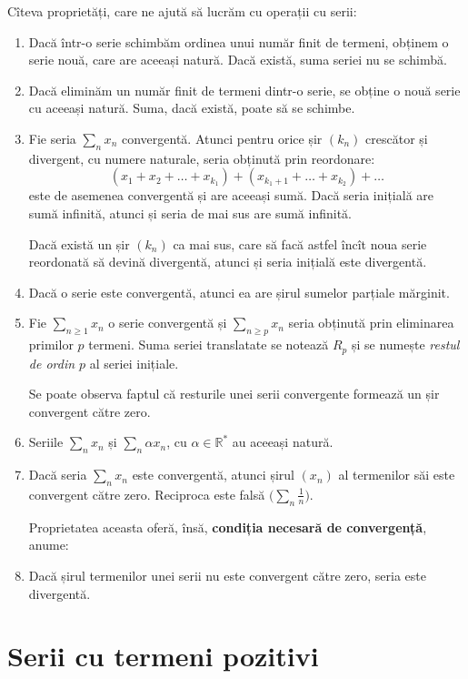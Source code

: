 \documentclass[11pt,a4paper]{article}
\newcommand\RR{\mathbb{R}}
\theoremstyle{dotless}
\theoremstyle{dotlessdr}
\begin{document}
Cîteva proprietăți, care ne ajută să lucrăm cu operații cu serii:
\begin{enumerate}[(1)]
  \item Dacă într-o serie schimbăm ordinea unui număr finit de termeni, obținem
    o serie nouă, care are aceeași natură. Dacă există, suma seriei nu se schimbă.
  \item Dacă eliminăm un număr finit de termeni dintr-o serie, se obține o nouă serie
    cu aceeași natură. Suma, dacă există, poate să se schimbe.
  \item Fie seria $\sum_n x_n$ convergentă. Atunci pentru orice șir $(k_n)$ crescător
    și divergent, cu numere naturale, seria obținută prin reordonare:
    \[
      (x_1 + x_2 + \dots + x_{k_1}) + (x_{k_1 + 1} + \dots + x_{k_2}) + \dots
    \]
    este de asemenea convergentă și are aceeași sumă. Dacă seria inițială are sumă
    infinită, atunci și seria de mai sus are sumă infinită.

    Dacă există un șir $(k_n)$ ca mai sus, care să facă astfel încît noua serie
    reordonată să devină divergentă, atunci și seria inițială este divergentă.
  \item Dacă o serie este convergentă, atunci ea are șirul sumelor parțiale mărginit.
  \item Fie $\sum_{n \geq 1} x_n$ o serie convergentă și $\sum_{n \geq p} x_n$ seria
    obținută prin eliminarea primilor $p$ termeni. Suma seriei translatate se notează
    $R_p$ și se numește \emph{restul de ordin $p$} al seriei inițiale.

    Se poate observa faptul că resturile unei serii convergente formează un șir
    convergent către zero.
  \item Seriile $\sum_n x_n$ și $\sum_n \alpha x_n$, cu $\alpha \in \RR^\ast$ au
    aceeași natură.
  \item Dacă seria $\sum_n x_n$ este convergentă, atunci șirul $(x_n)$ al termenilor
    săi este convergent către zero. Reciproca este falsă $\Big( \sum_n \frac{1}{n} \Big)$.

    Proprietatea aceasta oferă, însă, \textbf{condiția necesară de convergență}, anume:
  \item Dacă șirul termenilor unei serii nu este convergent către zero, seria este
    divergentă.
\end{enumerate}


\section{Serii cu termeni pozitivi}
\end{document}
